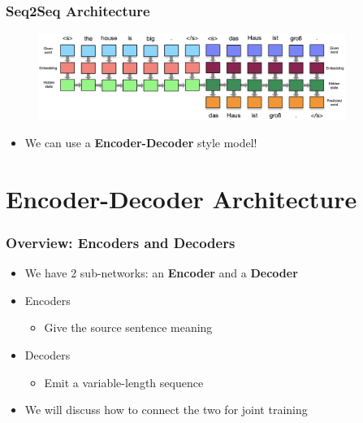 \documentclass[usenames,dvipsnames]{beamer}
\begin{document}
\begin{frame}
  \frametitle{Seq2Seq Architecture}
  \begin{figure}
    \centering
    \includegraphics[width=10cm, valign=c]{assets/enc-dec}
  \end{figure}
  \begin{itemize}
    \item We can use a \textbf{Encoder-Decoder} style model!
  \end{itemize}
\end{frame}

\section{Encoder-Decoder Architecture}

\begin{frame}
\frametitle{Overview: Encoders and Decoders}
\begin{itemize}
  \item We have 2 sub-networks: an \textbf{Encoder} and a \textbf{Decoder}
  \item Encoders
  \begin{itemize}
    \item Give the source sentence meaning
  \end{itemize}
  \item Decoders
  \begin{itemize}
    \item Emit a variable-length sequence
  \end{itemize}
  \item We will discuss how to connect the two for joint training
\end{itemize}
\end{frame}
\end{document}
